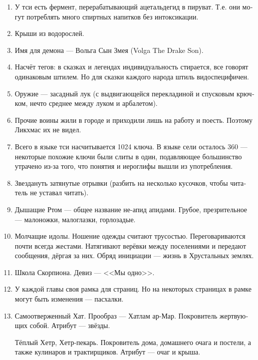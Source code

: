 \documentclass[a4paper,12pt,fleqn]{book}\usepackage{cooltooltips}\usepackage{polyglossia}\setdefaultlanguage[babelshorthands=true]{russian}\setotherlanguage{english}\defaultfontfeatures{Ligatures=TeX,Mapping=tex-text} \usepackage{xcolor}\definecolor{lightgray}{HTML}{bbbbbb}\color{lightgray}\newcommand{\ml}[3]{\textenglish{\textcolor{black}{#3}}}
\begin{document}
{\begin{enumerate}
\item У тси есть фермент, перерабатывающий ацетальдегид в пируват.
Т.е. они могут потреблять много спиртных напитков без интоксикации.

\item Крыши из водорослей.

\item Имя для демона --- Вольга Сын Змея (Volga The Drake Son).

\item Насчёт тегов: в сказках и легендах индивидуальность стирается, все говорят одинаковым штилем.
Но для сказки каждого народа штиль видоспецифичен.

\item Оружие --- засадный лук (с выдвигающейся перекладиной и спусковым крючком, нечто среднее между луком и арбалетом).

\item Прочие воины жили в городе и приходили лишь на работу и поесть.
Поэтому Ликхмас их не видел.

\item Всего в языке тси насчитывается 1024 ключа.
В языке сели осталось 360 --- некоторые похожие ключи были слиты в один, подавляющее большинство утрачено из-за того, что понятия и иероглифы вышли из употребления.

\item Звездануть затянутые отрывки (разбить на несколько кусочков, чтобы читатель не уставал читать).

\item Дышащие Ртом --- общее название не-апид апидами.
Грубое, презрительное --- малоножки, малоглазки, горлозадые.

\item Молчащие идолы.
Ношение одежды считают трусостью.
Переговариваются почти всегда жестами.
Натягивают верёвки между поселениями и передают сообщения, дёргая за них.
Обряд инициации --- жизнь в Хрустальных землях.

\item Школа Скорпиона.
Девиз --- <<Мы одно>>.


\item У каждой главы своя рамка для страниц.
Но на некоторых страницах в рамке могут быть изменения --- пасхалки.

\item Самоотверженный Хат.
Прообраз --- Хатлам ар-Мар.
Покровитель жертвующих собой.
Атрибут --- звёзды.

Тёплый Хетр, Хетр-пекарь.
Покровитель дома, домашнего очага и постели, а также кулинаров и трактирщиков.
Атрибут --- очаг и крыша.


\end{enumerate}}
\end{document}
